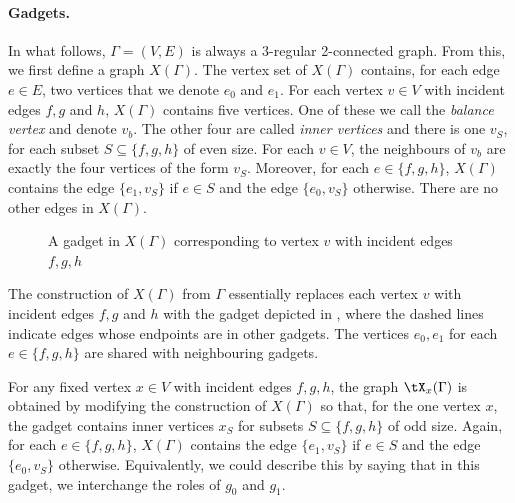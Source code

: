 \documentclass{toc}
\begin{document}
\paragraph{Gadgets.}
In what follows, $\Gamma = (V,E)$ is always a 3-regular 2-connected graph. From this,
we first define a graph $X(\Gamma)$. The vertex set of $X(\Gamma)$ contains, for each edge
$e \in E$, two vertices that we denote $e_0$ and $e_1$. For each vertex $v\in V$
with incident edges $f,g$ and $h$, $X(\Gamma)$ contains five vertices. One of these
we call the \emph{balance vertex} and denote $v_b$. The other four are called
\emph{inner vertices} and there is one $v_S$, for each subset $S \subseteq
\{f,g,h\}$ of even size. For each $v \in V$, the neighbours of $v_b$ are exactly
the four vertices of the form $v_S$. Moreover, for each $e \in \{f,g,h\}$,
$X(\Gamma)$ contains the edge $\{e_1,v_S\}$ if $e \in S$ and the edge $\{e_0,v_S\}$
otherwise. There are no other edges in $X(\Gamma)$.
\begin{figure}[ht]
  \begin{center} \def\svgwidth{2in}
  \end{center}
    \caption{A gadget in $X(\Gamma)$ corresponding to vertex $v$ with incident edges
      $f,g,h$}
    \label{fig:gadget}
\end{figure}

The construction of $X(\Gamma)$ from $\Gamma$ essentially replaces each vertex $v$ with
incident edges $f,g$ and $h$ with the gadget depicted in
, where the dashed lines indicate edges whose endpoints
are in other gadgets. The vertices $e_0,e_1$ for each $e \in \{f,g,h\}$ are
shared with neighbouring gadgets.

For any fixed vertex $x \in V$ with incident edges $f,g,h$, the graph $\tX_x(\Gamma)$
is obtained by modifying the construction of $X(\Gamma)$ so that, for the one vertex
$x$, the gadget contains inner vertices $x_S$ for subsets $S \subseteq
\{f,g,h\}$ of odd size. Again, for each $e \in \{f,g,h\}$, $X(\Gamma)$ contains the
edge $\{e_1,v_S\}$ if $e \in S$ and the edge $\{e_0,v_S\}$ otherwise.  Equivalently, we could describe this by saying that in this gadget, we interchange the roles of $g_0$ and $g_1$.
\end{document}
